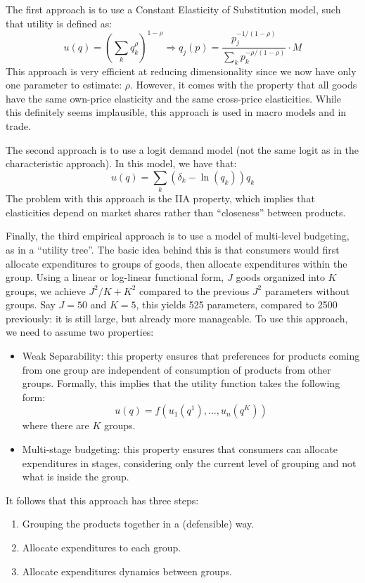 The first approach is to use a Constant Elasticity of Substitution model, such that utility is defined as: $$ u(q) = \left(\sum_k q_k^\rho\right)^{1-\rho} \Rightarrow q_j(p) = \frac{p_j^{-1/(1-\rho)}}{\sum_k p_k^{-\rho/(1-\rho)}} \cdot M $$
This approach is very efficient at reducing dimensionality since we now have only one parameter to estimate: $\rho$. However, it comes with the property that all goods have the same own-price elasticity and the same cross-price elasticities. While this definitely seems implausible, this approach is used in macro models and in trade.

The second approach is to use a logit demand model (not the same logit as in the characteristic approach). In this model, we have that: $$ u(q) = \sum_k (\delta_k - \ln(q_k))q_k $$ The problem with this approach is the IIA property, which implies that elasticities depend on market shares rather than ``closeness'' between products.

Finally, the third empirical approach is to use a model of multi-level budgeting, as in a ``utility tree''. The basic idea behind this is that consumers  would first allocate expenditures to groups of goods, then allocate expenditures within the group. Using a linear or log-linear functional form, $J$ goods organized into $K$ groups, we achieve $J^2	/K + K^2$ compared to the previous $J^2$ parameters without groups. Say $J = 50$ and $K=5$, this yields 525 parameters, compared to 2500 previously: it is still large, but already more manageable. To use this approach, we need to assume two properties:\begin{itemize}
\item Weak Separability: this property ensures that preferences for products coming from one group are independent of consumption of products from other groups. Formally, this implies that the utility function takes the following form: $$ u(q) = f(u_1(q^1), ..., u_n(q^K)) $$ where there are $K$ groups.
\item Multi-stage budgeting: this property ensures that consumers can allocate expenditures in stages, considering only the current level of grouping and not what is inside the group.
\end{itemize}

It follows that this approach has three steps: \begin{enumerate}
\item Grouping the products together in a (defensible) way.
\item Allocate expenditures to each group.
\item Allocate expenditures dynamics between groups.
\end{enumerate}

